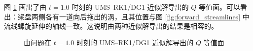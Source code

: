 图 \ref{fig:forward_Q} 画出了由 $t=1.0$ 时刻的 UMS–RK1/DG1 近似解导出的 $Q$ 等值面。可以看出：桨盘两侧各有一道向后拖出的涡，且其位置与图
\ref{fig:forward_streamlines} 中流线螺旋延伸的轴线一致。这说明由两种近似解导出的结果是相容的。

\begin{figure}[h!]
\begin{centering}
\par\end{centering}
\begin{centering}
\par\end{centering}
\caption{\label{fig:forward_Q}由问题在
$t=1.0$ 时刻的 UMS–RK1/DG1 近似解导出的 $Q$ 等值面}
\end{figure}


